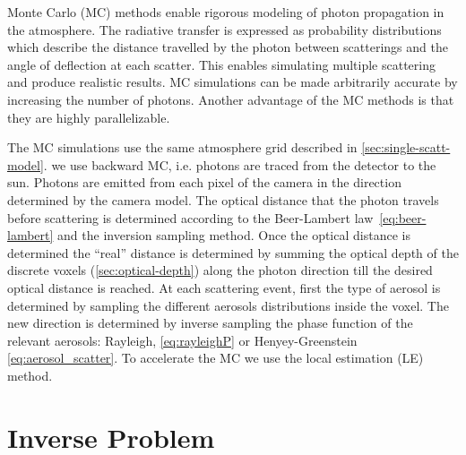 \documentclass[10pt,letterpaper]{article}
\begin{document}
Monte Carlo (MC) methods enable rigorous modeling of photon
propagation in the atmosphere. The radiative transfer is expressed as
probability distributions which describe the distance travelled by the
photon between scatterings and the angle of deflection at each
scatter.  This enables simulating multiple scattering and produce
realistic results.  MC simulations can be made arbitrarily accurate by
increasing the number of photons.  Another advantage of the MC methods
is that they are highly parallelizable.

The MC simulations use the same atmosphere grid described in
\cref{sec:single-scatt-model}. we use backward MC, i.e. photons are
traced from the detector to the sun. Photons are emitted from each
pixel of the camera in the direction determined by the camera
model. The optical distance that the photon travels before scattering
is determined according to the Beer-Lambert law~\cref{eq:beer-lambert}
and the inversion sampling method. Once the optical distance is
determined the ``real'' distance is determined by summing the optical
depth of the discrete voxels (\cref{sec:optical-depth}) along the
photon direction till the desired optical distance is reached.  At
each scattering event, first the type of aerosol is determined by
sampling the different aerosols distributions inside the voxel. The
new direction is determined by inverse sampling the phase function of
the relevant aerosols: Rayleigh, \cref{eq:rayleighP} or
Henyey-Greenstein \cref{eq:aerosol_scatter}.  To accelerate the MC we
use the local estimation (LE) method.



\section{Inverse Problem}
\label{sec:inverse-problem}
\end{document}
